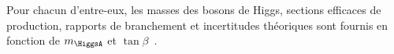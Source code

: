 Pour chacun d'entre-eux, les masses des bosons de Higgs, sections efficaces de production, rapports de branchement et incertitudes théoriques sont fournis en fonction de $m_{\HiggsA}$ et $\tan\beta$~\cite{MSSMneutralHiggsTwiki}.
